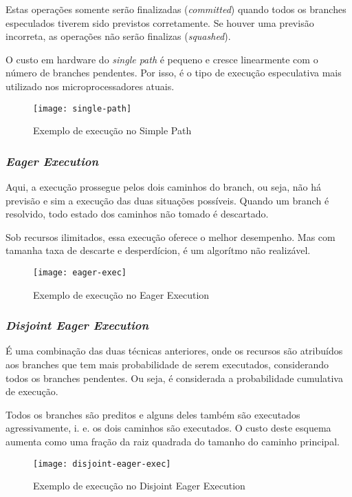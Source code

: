 Estas operações somente serão finalizadas (\textit{committed}) quando todos os branches especulados tiverem sido previstos corretamente. Se houver uma previsão incorreta, as operações não serão finalizas (\textit{squashed}).

O custo em hardware do \textit{single path} é pequeno e cresce linearmente com o número de branches pendentes. Por isso, é o tipo de execução especulativa mais utilizado nos microprocessadores atuais.

\begin{figure}[ht]
  \centering
  \texttt{[image: single-path]}
  \caption{Exemplo de execução no Simple Path}
  \label{fig:single-path}
\end{figure}




\subsubsection{\textit{Eager Execution}}
Aqui, a execução prossegue pelos dois caminhos do branch, ou seja, não há previsão e sim a execução das duas situações possíveis. Quando um branch é resolvido, todo estado dos caminhos não tomado é descartado.

Sob recursos ilimitados, essa execução oferece o melhor desempenho. Mas com tamanha taxa de descarte e desperdícion, é um algorítmo não realizável.

\begin{figure}[ht]
  \centering
  \texttt{[image: eager-exec]}
  \caption{Exemplo de execução no Eager Execution}
  \label{fig:eager-exec}
\end{figure}


\subsubsection{\textit{Disjoint Eager Execution}}
É uma combinação das duas técnicas anteriores, onde os recursos são atribuídos aos branches que tem mais probabilidade de serem executados, considerando todos os branches pendentes. Ou seja, é considerada a probabilidade cumulativa de execução.

Todos os branches são preditos e alguns deles também são executados agressivamente, i. e. os dois caminhos são executados. O custo deste esquema aumenta como uma fração da raiz quadrada do tamanho do caminho principal.

\begin{figure}[ht]
  \centering
  \texttt{[image: disjoint-eager-exec]}
  \caption{Exemplo de execução no Disjoint Eager Execution}
  \label{fig:disjoint-eager-exec}
\end{figure}




